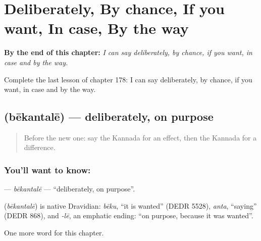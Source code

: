 
\chapter{Deliberately, By chance, If you want, In case, By the way}
\label{ch:ka-deliberately-by-chance-if-you-want-in-case-by-the-way}

\begin{chapteropening}
\textbf{By the end of this chapter:} \emph{I can say deliberately, by chance, if you want, in case and by the way.}

Complete the last lesson of chapter 178: I can say deliberately, by chance, if you want, in case and by the way.
\end{chapteropening}

\section[\texorpdfstring{\kn{ಬೇಕಂತಲೇ} (bēkantalē)}{ಬೇಕಂತಲೇ (bēkantalē)}]{ (bēkantalē) — deliberately, on purpose}

\label{lesson:KA-C178-bekantale}



\begin{quote}
Before the new one: say the Kannada for an effect, then the Kannada for a difference.
\end{quote}

\subsection*{You'll want to know: }
\textbf{} — \emph{bēkantalē} — \textquotedblleft{}deliberately, on purpose\textquotedblright{}.

\begin{cousinweb}
\textbf{} (\emph{bēkantalē}) is native Dravidian: \emph{bēku}, \textquotedblleft{}it is wanted\textquotedblright{} (DEDR 5528), \emph{anta}, \textquotedblleft{}saying\textquotedblright{} (DEDR 868), and \emph{-lē}, an emphatic ending: \textquotedblleft{}on purpose, because it was wanted\textquotedblright{}.
\end{cousinweb}

\begin{grammarlens}[title={What you've built}]
One more word for this chapter.
\end{grammarlens}

